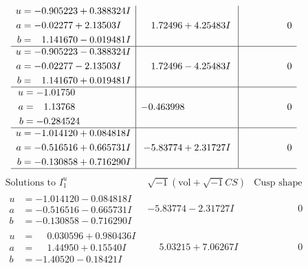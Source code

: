 \documentclass[1p]{elsarticle_modified}
\theoremstyle{definition}
\newcommand{\I}{\sqrt{-1}}
\begin{document}
$$\begin{array}{c|c|c}
\begin{aligned}
u &= -0.905223 + 0.388324 I \\
a &= -0.02277 + 2.13503 I \\
b &= \phantom{-}1.141670 - 0.019481 I\end{aligned}
 & \phantom{-}1.72496 + 4.25483 I & \phantom{-0.000000 } 0 \\ \hline\begin{aligned}
u &= -0.905223 - 0.388324 I \\
a &= -0.02277 - 2.13503 I \\
b &= \phantom{-}1.141670 + 0.019481 I\end{aligned}
 & \phantom{-}1.72496 - 4.25483 I & \phantom{-0.000000 } 0 \\ \hline\begin{aligned}
u &= -1.01750\phantom{ +0.000000I} \\
a &= \phantom{-}1.13768\phantom{ +0.000000I} \\
b &= -0.284524\phantom{ +0.000000I}\end{aligned}
 & -0.463998\phantom{ +0.000000I} & \phantom{-0.000000 } 0 \\ \hline\begin{aligned}
u &= -1.014120 + 0.084818 I \\
a &= -0.516516 + 0.665731 I \\
b &= -0.130858 + 0.716290 I\end{aligned}
 & -5.83774 + 2.31727 I & \phantom{-0.000000 } 0\\
 \hline 
 \end{array}$$\newpage$$\begin{array}{c|c|c}  
\text{Solutions to }I^u_{1}& \I (\text{vol} + \sqrt{-1}CS) & \text{Cusp shape}\\
 \hline 
\begin{aligned}
u &= -1.014120 - 0.084818 I \\
a &= -0.516516 - 0.665731 I \\
b &= -0.130858 - 0.716290 I\end{aligned}
 & -5.83774 - 2.31727 I & \phantom{-0.000000 } 0 \\ \hline\begin{aligned}
u &= \phantom{-}0.030596 + 0.980436 I \\
a &= \phantom{-}1.44950 + 0.15540 I \\
b &= -1.40520 - 0.18421 I\end{aligned}
 & \phantom{-}5.03215 + 7.06267 I & \phantom{-0.000000 } 0 \\ \hline\begin{aligned}

\end{aligned}
\end{array}$$
\end{document}
